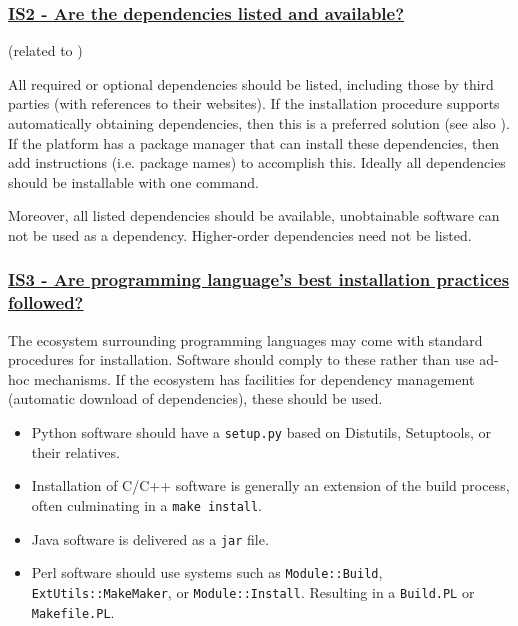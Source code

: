 \documentclass[a4paper,11pt]{article}
\newcommand{\criterion}[2]{\subsubsection*{\underline{#1 - #2}}\label{id:#1}}
\newcommand\CheckTable{%
  \begin{tabular}{ccccc}
    No & Minimal & Adequate & Good & Perfect \\
    0 & 1 & 2 & 3 & 4 \\
    \hline
    $\square$ & $\square$ & $\square$ & $\square$ & $\square$ \\
  \end{tabular}%
}
\newcommand{\refcrit}[1]{%
 \framebox[1.1\width]{\hyperref[id:#1]{#1}}
}
\begin{document}

\newcommand{\isTwoID}{IS2}
\newcommand{\isTwoText}{Are the dependencies listed and available?}
\criterion{\isTwoID}{\isTwoText}
(related to \refcrit{B3})

All required or optional dependencies should be listed, including those by
third parties (with references to their websites). If the installation
procedure supports automatically obtaining dependencies, then this is a
preferred solution (see also \refcrit{IS3}). If the platform has a package manager that
can install these dependencies, then add instructions (i.e. package names) to
accomplish this. Ideally all dependencies should be installable with one
command.

Moreover, all listed dependencies should be available, unobtainable software
can not be used as a dependency. Higher-order dependencies need not be listed.
%
%


\newcommand{\isThreeID}{IS3}
\newcommand{\isThreeText}{Are programming language's best installation practices followed?}
\criterion{\isThreeID}{\isThreeText}

The ecosystem surrounding programming languages may come with standard
procedures for installation. Software should comply to these rather than use
ad-hoc mechanisms. If the ecosystem has facilities for dependency management
(automatic download of dependencies), these should be used.

\begin{itemize}
 \item Python software should have a \texttt{setup.py} based on Distutils,
     Setuptools, or their relatives.
 \item Installation of C/C++ software is generally an extension of the build
     process, often culminating in a \texttt{make install}.
 \item Java software is delivered as a \texttt{jar} file.
 \item Perl software should use systems such as \texttt{Module::Build},
     \texttt{ExtUtils::MakeMaker}, or \texttt{Module::Install}. Resulting in a
     \texttt{Build.PL} or \texttt{Makefile.PL}.
\end{itemize}
\end{document}
